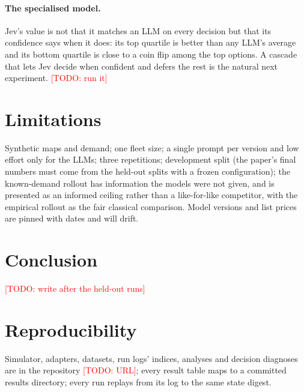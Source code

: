 \documentclass[11pt]{article}
\newcommand{\todo}[1]{\textcolor{red}{[TODO: #1]}}
\begin{document}
\paragraph{The specialised model.} Jev's value is not that it matches an LLM on every decision but that its confidence says when it does: its top quartile is better than any LLM's average and its bottom quartile is close to a coin flip among the top options. A cascade that lets Jev decide when confident and defers the rest is the natural next experiment. \todo{run it}

\section{Limitations}
Synthetic maps and demand; one fleet size; a single prompt per version and low effort only for the LLMs; three repetitions; development split (the paper's final numbers must come from the held-out splits with a frozen configuration); the known-demand rollout has information the models were not given, and is presented as an informed ceiling rather than a like-for-like competitor, with the empirical rollout as the fair classical comparison. Model versions and list prices are pinned with dates and will drift.

\section{Conclusion}
\todo{write after the held-out runs}

\section*{Reproducibility}
Simulator, adapters, datasets, run logs' indices, analyses and decision diagnoses are in the repository \todo{URL}; every result table maps to a committed results directory; every run replays from its log to the same state digest.



\end{document}
